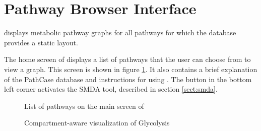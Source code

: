 \section{Pathway Browser Interface}
\label{sect:maw_interface}

\mawapp displays metabolic pathway graphs for all pathways for which the
\pathcasemaw database provides a static layout.

The home screen of \mawapp displays a list of pathways that the user can choose
from to view a graph. This screen is shown in figure
\ref{fig:maw_screenshot_list}. It also contains a brief explanation of the
PathCase database and instructions for using \mawapp. The button in the bottom
left corner activates the SMDA tool, described in section \ref{sect:smda}.

\begin{figure}[htbp]
    \caption{\label{fig:maw_screenshot_list} List of pathways on the main screen
    of \mawapp}
\end{figure}

\begin{figure}[hbtp]
    \caption{\label{fig:maw_screenshot_pathway} Compartment-aware visualization
    of Glycolysis}
\end{figure}

